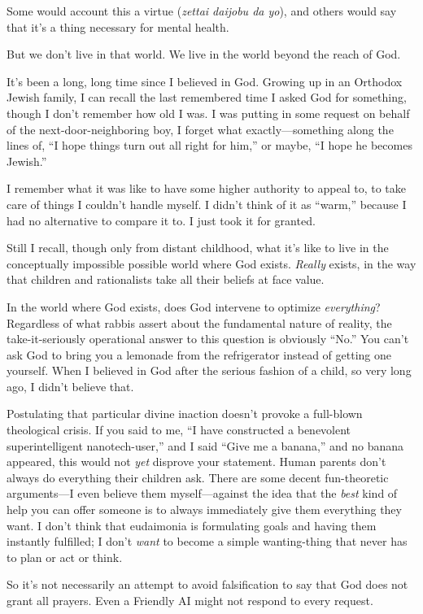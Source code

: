 {
 Some would account this a virtue (\textit{zettai daijobu da yo}),
and others would say that it's a thing necessary for
mental health.}

{
 But we don't live in that world. We live in the
world beyond the reach of God.}

{
 It's been a long, long time since I believed in
God. Growing up in an Orthodox Jewish family, I can recall the last
remembered time I asked God for something, though I
don't remember how old I was. I was putting in some
request on behalf of the next-door-neighboring boy, I forget what
exactly---something along the lines of, ``I hope
things turn out all right for him,'' or maybe,
``I hope he becomes Jewish.''}

{
 I remember what it was like to have some higher authority to
appeal to, to take care of things I couldn't handle
myself. I didn't think of it as
``warm,'' because I had no
alternative to compare it to. I just took it for granted.}

{
 Still I recall, though only from distant childhood, what
it's like to live in the conceptually impossible
possible world where God exists. \textit{Really} exists, in the way
that children and rationalists take all their beliefs at face value.}

{
 In the world where God exists, does God intervene to optimize
\textit{everything}? Regardless of what rabbis assert about the
fundamental nature of reality, the take-it-seriously operational answer
to this question is obviously
``No.'' You can't
ask God to bring you a lemonade from the refrigerator instead of
getting one yourself. When I believed in God after the serious fashion
of a child, so very long ago, I didn't believe that.}

{
 Postulating that particular divine inaction
doesn't provoke a full-blown theological crisis. If you
said to me, ``I have constructed a benevolent
superintelligent nanotech-user,'' and I said
``Give me a banana,'' and no banana
appeared, this would not \textit{yet} disprove your statement. Human
parents don't always do everything their children ask.
There are some decent fun-theoretic arguments---I even believe them
myself---against the idea that the \textit{best} kind of help you can
offer someone is to always immediately give them everything they want.
I don't think that eudaimonia is formulating goals and
having them instantly fulfilled; I don't \textit{want}
to become a simple wanting-thing that never has to plan or act or
think.}

{
 So it's not necessarily an attempt to avoid
falsification to say that God does not grant all prayers. Even a
Friendly AI might not respond to every request.}

